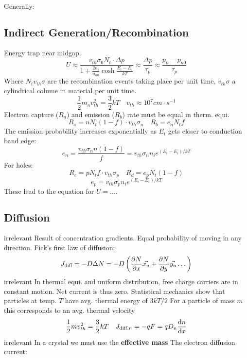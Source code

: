 \documentclass[a4paper, fontsize=8pt, landscape, DIV=1]{scrartcl}
\newcommand{\makeultracompact}{irrelevant}
\begin{document}
\begin{multicols*}{4}
    Generally:

  \subsection{Indirect Generation/Recombination}
    Energy trap near midgap.
    \[ U \approx  \frac{v_{th}\sigma_0N_t\cdot\Delta p}{1 + \frac{2n_i}{n_{n0}}\cosh\frac{E_t - E_i}{kT}} \approx \frac{\Delta p}{\tau_p} \approx \frac{p_n - p_{n0}}{\tau_p}\]
    Where $N_tv_{th}\sigma$ are the recombination events taking place per unit time, $v_{th}\sigma$ a cylindrical colume in material per unit time.
    \[\frac{1}{2}m_nv_{th}^2=\frac{3}{2}kT \quad v_{th}\approx 10^7 cm\cdot s^{-1}\]
    Electron capture ($R_a$) and emission ($R_b$) rate must be equal in therm. equi.
    \[R_a = nN_t(1-f)\cdot v_{th}\sigma_n \quad R_b = e_nN_tf\]
    The emission probability increases exponentially as $E_t$ gets closer to conduction band edge:
    \[e_n = \frac{v_{th}\sigma_nn(1-f)}{f}=v_{th}\sigma_nn_ie^{(E_t-E_i)/kT}\]
    For holes:
    \[R_c = pN_tf\cdot v_{th}\sigma_p \quad R_d = e_pN_t(1-f)\]
    \[e_p = v_{th}\sigma_p n_i e^{(E_i-E_t)/kT}\]
    These lead to the equation for $U=\dots$.

  \subsection{Diffusion}
    \ifdefined\makeultracompact\else
      Result of concentration gradients.
      Equal probability of moving in any direction.
      Fick's first law of diffusion:
    \fi
    \[J_{\text{diff}} = -D\Delta N = -D \left( \frac{\partial N}{\partial x}\vec{x_u} + \frac{\partial N}{\partial y}\vec{y_u} \dots \right)\]
    \ifdefined\makeultracompact\else
      In thermal equi. and uniform distribution, free charge carriers are in constant motion. 
      Net current is thus zero.
      Statistical mechanics show that particles at temp. $T$ have avg. thermal energy of $3kT/2$
      For a particle of mass $m$ this corresponds to an avg. thermal velocity
    \fi
    \[\frac{1}{2}mv_{th}^2=\frac{3}{2}kT \quad J_{\text{diff},n} = -qF = qD_n\frac{\mathrm{d}n}{\mathrm{d}x}\]
    \ifdefined\makeultracompact\else
      In a crystal we must use the \textbf{effective mass}
      The electron diffusion current:
    \fi


\end{multicols*}
\end{document}
